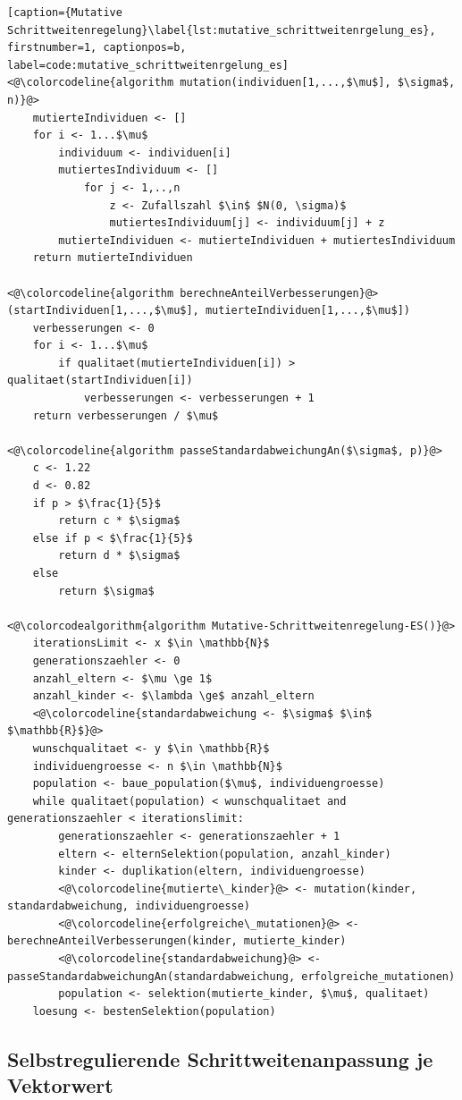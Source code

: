 \begin{lstlisting}[caption={Mutative Schrittweitenregelung}\label{lst:mutative_schrittweitenrgelung_es}, firstnumber=1, captionpos=b, label=code:mutative_schrittweitenrgelung_es]
<@\colorcodeline{algorithm mutation(individuen[1,...,$\mu$], $\sigma$, n)}@>
	mutierteIndividuen <- []
	for i <- 1...$\mu$
		individuum <- individuen[i]
		mutiertesIndividuum <- []		
			for j <- 1,..,n
				z <- Zufallszahl $\in$ $N(0, \sigma)$
				mutiertesIndividuum[j] <- individuum[j] + z
		mutierteIndividuen <- mutierteIndividuen + mutiertesIndividuum
	return mutierteIndividuen
	
<@\colorcodeline{algorithm berechneAnteilVerbesserungen}@>(startIndividuen[1,...,$\mu$], mutierteIndividuen[1,...,$\mu$])
	verbesserungen <- 0	
	for i <- 1...$\mu$
		if qualitaet(mutierteIndividuen[i]) > qualitaet(startIndividuen[i])
			verbesserungen <- verbesserungen + 1
	return verbesserungen / $\mu$
	
<@\colorcodeline{algorithm passeStandardabweichungAn($\sigma$, p)}@>
	c <- 1.22
	d <- 0.82
	if p > $\frac{1}{5}$
		return c * $\sigma$
	else if p < $\frac{1}{5}$
		return d * $\sigma$
	else
		return $\sigma$

<@\colorcodealgorithm{algorithm Mutative-Schrittweitenregelung-ES()}@>
	iterationsLimit <- x $\in \mathbb{N}$
	generationszaehler <- 0
	anzahl_eltern <- $\mu \ge 1$
	anzahl_kinder <- $\lambda \ge$ anzahl_eltern
	<@\colorcodeline{standardabweichung <- $\sigma$ $\in$ $\mathbb{R}$}@>
	wunschqualitaet <- y $\in \mathbb{R}$
	individuengroesse <- n $\in \mathbb{N}$
	population <- baue_population($\mu$, individuengroesse)
	while qualitaet(population) < wunschqualitaet and generationszaehler < iterationslimit:
		generationszaehler <- generationszaehler + 1
		eltern <- elternSelektion(population, anzahl_kinder)
		kinder <- duplikation(eltern, individuengroesse)
		<@\colorcodeline{mutierte\_kinder}@> <- mutation(kinder, standardabweichung, individuengroesse)
		<@\colorcodeline{erfolgreiche\_mutationen}@> <- berechneAnteilVerbesserungen(kinder, mutierte_kinder)
		<@\colorcodeline{standardabweichung}@> <- passeStandardabweichungAn(standardabweichung, erfolgreiche_mutationen)
		population <- selektion(mutierte_kinder, $\mu$, qualitaet)
	loesung <- bestenSelektion(population)
\end{lstlisting}

\subsection{Selbstregulierende Schrittweitenanpassung je Vektorwert}


